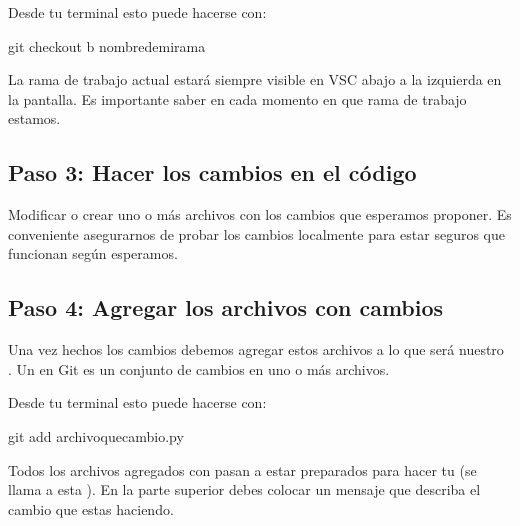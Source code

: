 \documentclass[a5paper,9pt,spanish]{sphinxmanual}
\begin{document}
\noindent{}

\sphinxAtStartPar
Desde tu terminal esto puede hacerse con:

\begin{sphinxVerbatim}[commandchars=\\\{\}]
git checkout \PYGZhy{}b nombre\PYGZus{}de\PYGZus{}mi\PYGZus{}rama
\end{sphinxVerbatim}

\sphinxAtStartPar
La rama de trabajo actual estará siempre visible en VSC
abajo a la izquierda en la pantalla.
Es importante saber en cada momento en que rama de trabajo estamos.


\subsection{Paso 3: Hacer los cambios en el código}
\label{\detokenize{mi-primer-pr:paso-3-hacer-los-cambios-en-el-codigo}}
\sphinxAtStartPar
Modificar o crear uno o más archivos con los cambios que esperamos proponer.
Es conveniente asegurarnos de probar los cambios localmente para estar
seguros que funcionan según esperamos.


\subsection{Paso 4: Agregar los archivos con cambios}
\label{\detokenize{mi-primer-pr:paso-4-agregar-los-archivos-con-cambios}}
\sphinxAtStartPar
Una vez hechos los cambios debemos agregar estos archivos a lo que será nuestro .
Un  en Git es un conjunto de cambios en uno o más archivos.

\sphinxAtStartPar
Desde tu terminal esto puede hacerse con:

\begin{sphinxVerbatim}[commandchars=\\\{\}]
git add archivo\PYGZus{}que\PYGZus{}cambio.py
\end{sphinxVerbatim}

\noindent{}

\sphinxAtStartPar
Todos los archivos agregados con  pasan a estar preparados para hacer
tu  (se llama  a esta ).
En la parte superior debes colocar un mensaje que describa el cambio que estas haciendo.
\end{document}
